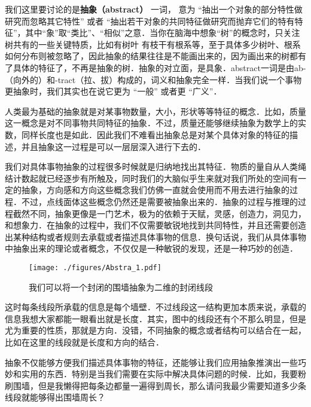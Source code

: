 

\begin{issues}
\issueTODO
\end{issues}

我们这里要讨论的是\textbf{抽象（abstract）} 一词， 意为 “抽出一个对象的部分特性做研究而忽略其它特性” 或者 “抽出若干对象的共同特征做研究而抛弃它们的特有特征”，其中“象”取“类比”、“相似”之意．当你在脑海中想象“树”的概念时，只关注树共有的一些关键特质，比如有树叶 有枝干有根系等，至于具体多少树叶、根系如何分布则被忽略了，因此抽象的结果往往是不能画出来的，因为画出来的树都有了具体的特征了，不再是抽象的树．抽象的对立面，是具象．abstract一词是由ab-（向外的）和-tract（拉、拔）构成的，词义和抽象完全一样．当我们说一个事物更抽象时，我们其实也在说它更为 “一般” 或者更 “广义”．


人类最为基础的抽象就是对某事物数量，大小，形状等等特征的概念．比如，质量这一概念是对不同事物共同特征的抽象．不过，质量还能够继续抽象为数学上的实数，同样长度也是如此．因此我们不难看出抽象总是对某个具体对象的特征的描述，并且抽象这一过程是可以一层层深入进行下去的．

我们对具体事物抽象的过程很多时候就是归纳地找出其特征．物质的量自从人类绳结计数起就已经逐步有所触及，同时我们的大脑似乎生来就对我们所处的空间有一定的抽象，方向感和方向这些概念我们仿佛一直就会使用而不用去进行抽象的过程．不过，点线面体这些概念仍然还是需要被抽象出来的．抽象的过程与推理的过程截然不同，抽象更像是一门艺术，极为的依赖于天赋，灵感，创造力，洞见力，和想象力．在抽象的过程中，我们不仅需要敏锐地找到共同特性，并且还需要创造出某种结构或者规则去承载或者描述具体事物的信息．换句话说，我们从具体事物中抽象出来的理论或者概念，不仅仅是一种敏锐的发现，还是一种巧妙的创造．

\begin{figure}[ht]
\centering
\texttt{[image: ./figures/Abstra\_1.pdf]}
\caption{我们可以将一个封闭的围墙抽象为二维的封闭线段} \label{Abstra_fig1}
\end{figure}

这时每条线段所承载的信息是每个墙壁．不过线段这一结构更加本质来说，承载的信息我想大家都能一眼看出就是长度．其实，图中的线段还有个不那么明显，但是尤为重要的性质，那就是方向．没错，不同抽象的概念或者结构可以结合在一起，比如在这里的线段就是长度和方向的结合．

抽象不仅能够方便我们描述具体事物的特征，还能够让我们应用抽象推演出一些巧妙和实用的东西．特别是当我们需要在实际中解决具体问题的时候．比如，我要粉刷围墙，但是我懒得把每条边都量一遍得到周长，那么请问我最少需要知道多少条线段就能够得出围墙周长？

